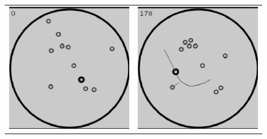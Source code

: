 \documentclass[a4paper]{report}
\begin{document}
\pagebreak[4]
\begin{figure}[p]
\begin{tabular}{cc}
\includegraphics{screenshots/0.eps} & 
\includegraphics{screenshots/178.eps} \\

\end{tabular}
\end{figure}
\end{document}
